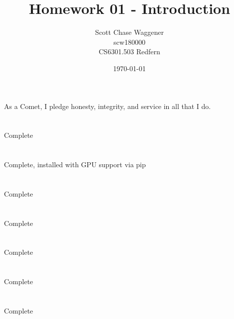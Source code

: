 \documentclass[12pt]{article}
\title{Homework 01 - Introduction}
\author{
        Scott Chase Waggener \\
		scw180000 \\
		CS6301.503 Redfern
}
\date{\today}
\begin{document}
\maketitle
\begin{center}
As a Comet, I pledge honesty, integrity, and service in all that I do.
\end{center}

\section{}
Complete

\section{}
Complete, installed with GPU support via pip

\section{}
Complete

\section{}
Complete

\section{}
Complete

\section{}
Complete

\section{}
Complete
\end{document}
